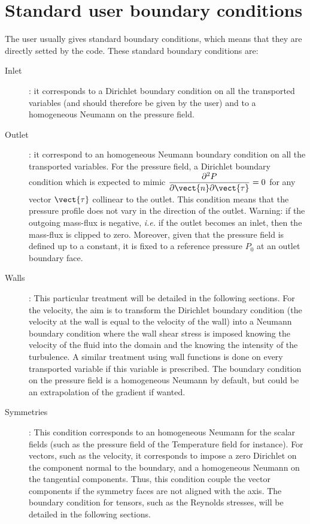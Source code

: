 \section{Standard user boundary conditions}

The user usually gives standard boundary conditions, which means that 
they are directly setted by the code. These standard boundary conditions are:

\begin{description}
\item[Inlet]: it corresponds to a Dirichlet boundary condition on all the transported variables 
(and should therefore be given by the user) 
and to a homogeneous Neumann on the pressure field. 

\item[Outlet]: it correspond to an homogeneous Neumann boundary condition on all the transported variables.
For the pressure field, a Dirichlet boundary condition which is expected to mimic $\displaystyle\frac{\partial^2 P}{\partial \vect{n}\partial\vect{\tau}}=0$ for any vector  $\vect{\tau}$ collinear to the outlet. This condition means that the pressure
profile does not vary in the direction of the outlet. Warning: if the outgoing mass-flux is negative, 
\emph{i.e.} if the outlet becomes an inlet, then the mass-flux is clipped to zero. Moreover, given
that the pressure field is defined up to a constant, it is fixed to a reference pressure $P_0$
at an outlet boundary face.
 
\item[Walls]: This particular treatment will be detailed in the following sections. 
For the velocity, the aim is to transform the Dirichlet boundary condition (the velocity at the wall 
is equal to the velocity of the wall) into a Neumann boundary condition where the wall shear stress
is imposed knowing the velocity of the fluid into the domain and the knowing the intensity of the turbulence. 
A similar treatment using wall functions is done on every transported variable if this variable is prescribed.
The boundary condition on the pressure field is a homogeneous Neumann by default, but could
be an extrapolation of the gradient if wanted.

\item[Symmetries]: This condition corresponds to an homogeneous Neumann for the scalar fields 
(such as the pressure field of the Temperature field for instance). For vectors, such as the velocity, it corresponds
to impose a zero Dirichlet on the component normal to the boundary, and a homogeneous Neumann
on the tangential components. Thus, this condition couple the  vector components if the symmetry faces are not
aligned with the axis. The boundary condition for tensors, such as the Reynolds stresses, will be detailed in the following sections.
\end{description}

